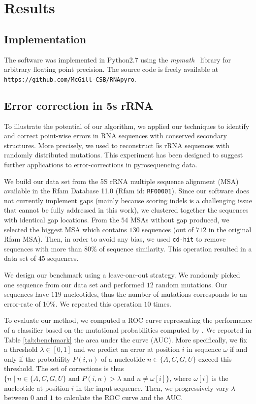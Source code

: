 \section{Results}
\label{sec:results}

\subsection{Implementation}
The software was implemented in Python2.7 using the \textit{mpmath}~\cite{mpmath} library
for  arbitrary floating point precision. The source code is freely available at \verb+https://github.com/McGill-CSB/RNApyro+.

\subsection{Error correction in 5s rRNA}

To illustrate the potential of our algorithm, we applied our techniques to identify and correct point-wise errors in RNA sequences
with conserved secondary structures. More precisely, we used \RNApyro to reconstruct 5s rRNA sequences with randomly distributed
mutations. This experiment has been designed to suggest further applications to error-corrections in pyrosequencing data.

We build our data set from the 5S rRNA multiple sequence alignment (MSA) available in the Rfam Database 11.0 (Rfam id: \texttt{RF00001}).
Since our software does not currently implement gaps (mainly because scoring indels is a challenging issue that cannot be fully addressed
in this work),  we clustered together the sequences with identical gap locations. From the $54$ MSAs without gap produced, we selected the
biggest MSA  which contains $130$ sequences (out of $712$ in the original Rfam MSA). Then, in order to avoid any bias, we used \texttt{cd-hit}
\cite{CDHIT} to remove sequences with more than 80\% of sequence similarity. This operation resulted in a data set of $45$ sequences. 

We design our benchmark using a leave-one-out strategy. We randomly picked one sequence from our data set and performed $12$ random
mutations. Our sequences have $119$ nucleotides, thus the number of mutations corresponds to an error-rate of 10\%. We repeated this operation 
$10$ times. 

To evaluate our method, we computed a ROC curve representing the performance of a classifier based on the mutational probabilities computed by
\RNApyro. We reported in Table \ref{tab:benchmark} the area under the curve (AUC). More specifically, we fix a threshold $\lambda \in [0,1]$ and we
predict an error at position $i$ in sequence $\omega$ if and only if the probability $P(i,n)$ of a nucleotide $n \in \{ A,C,G,U \}$ exceed this threshold.
The set of corrections is thus $\{ n \; | \;  n \in \{ A,C,G,U \} \mbox{ and } P(i,n) > \lambda \mbox{ and }  n \neq \omega[i] \}$, where $\omega[i]$ is the
nucleotide at position $i$ in the input sequence. Then, we progressively vary $\lambda$ between $0$ and $1$ to calculate the ROC curve and the AUC.



